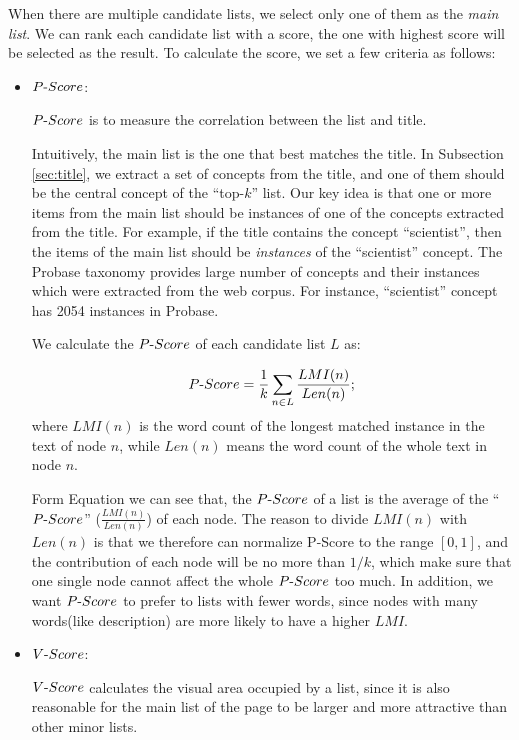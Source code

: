 When there are multiple candidate lists,
we select only one of them as the {\em main list}.
We can rank each candidate list with a score, the one with highest score will be selected as the result.
To calculate the score, we set a few criteria as follows:

\begin{itemize}
  \item \textbf{$P\textnormal{-}Score$}:

  $P\textnormal{-}Score$ is to measure the correlation between the list and title.

  Intuitively, the main list is the one that best matches the title.
In Subsection \ref{sec:title}, we extract a set of concepts from
the title, and one of them should be the central concept of the ``top-$k$'' list.
Our key idea is that one or more items from the main list should be instances
of one of the concepts extracted from the title. For example, if the title
contains the concept ``scientist'', then the items of the main list should
be {\em instances} of the ``scientist'' concept. The Probase taxonomy provides
large number of concepts and their instances which were extracted from the
web corpus. For instance, ``scientist'' concept has 2054 instances in
Probase.

We calculate the $P\textnormal{-}Score$ of each candidate list $L$ as:

\begin{equation}\label{equ:pScore}
    P\textnormal{-}Score= \frac{1}{k} \sum_{n \in L} \frac{LMI(n)}{Len(n)};
\end{equation}
where $LMI(n)$ is the word count of the longest matched
instance in the text of node $n$,
while $Len(n)$ means the word count of the whole text in node $n$.

Form Equation we can see that, the $P\textnormal{-}Score$ of a list is the average of the ``$P\textnormal{-}Score$'' ($\frac{LMI(n)}{Len(n)}$) of each node.
The reason to divide $LMI(n)$ with $Len(n)$ is that we therefore can normalize P-Score to the range $[0,1]$, and the contribution of each node will be no more than $1/k$, which make sure that one single node cannot affect the whole $P\textnormal{-}Score$ too much. In addition, we want $P\textnormal{-}Score$ to prefer to lists with fewer words, since nodes with many words(like description) are more likely to have a higher $LMI$.

  \item \textbf{$V\textnormal{-}Score$}:

$V\textnormal{-}Score$ calculates the visual area occupied by a list,
since it is also reasonable for the main list of the page to be larger and more attractive than other minor lists.


\end{itemize}
